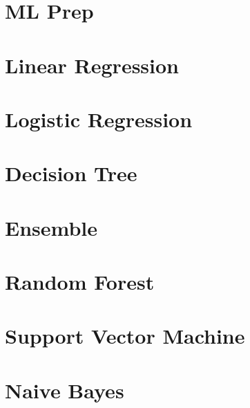  \section[ML Prep]{ML Prep}
% 



 \section[LinRegr]{Linear Regression}




 \section[LogiRegr]{Logistic Regression}





 \section[Tree]{Decision Tree}



 \section[Ensemble]{Ensemble}



 \section[RandomForest]{Random Forest}




 \section[SVM]{Support Vector Machine}



 \section[NB]{Naive Bayes}



